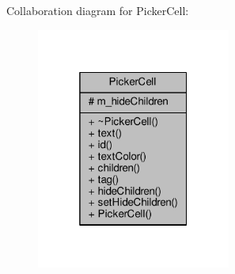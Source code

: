 Collaboration diagram for Picker\+Cell\+:
\nopagebreak
\begin{figure}[H]
\begin{center}
\leavevmode
\includegraphics[width=181pt]{dd/d55/classPickerCell__coll__graph}
\end{center}
\end{figure}
